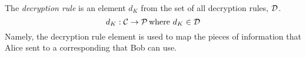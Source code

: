 \begin{definition}\label{def:Decryption_Rule}
  The \emph{decryption rule} is an element $d_{K}$ from the set of all decryption rules, $\operatorname{\mathcal{D}}$.
  \begin{equation}\label{eq:Decryption_Rule}
    d_{K} : \operatorname{\mathcal{C}} \rightarrow \operatorname{\mathcal{P}} \text{where } d_{K} \in \operatorname{\mathcal{D}}
  \end{equation}
    Namely, the decryption rule element is used to map the  pieces of information that Alice sent to a corresponding  that Bob can use.
\end{definition}
